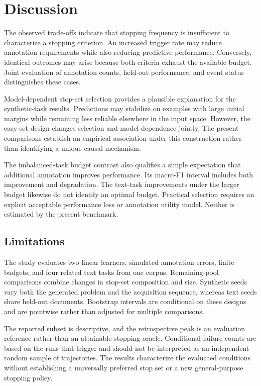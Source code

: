 \documentclass[10pt,twocolumn]{article}
\begin{document}
\section{Discussion}
The observed trade-offs indicate that stopping frequency is insufficient to characterize a stopping criterion. An increased trigger rate may reduce annotation requirements while also reducing predictive performance. Conversely, identical outcomes may arise because both criteria exhaust the available budget. Joint evaluation of annotation counts, held-out performance, and event status distinguishes these cases.

Model-dependent stop-set selection provides a plausible explanation for the synthetic-task results. Predictions may stabilize on examples with large initial margins while remaining less reliable elsewhere in the input space. However, the easy-set design changes selection and model dependence jointly. The present comparisons establish an empirical association under this construction rather than identifying a unique causal mechanism.

The imbalanced-task budget contrast also qualifies a simple expectation that additional annotation improves performance. Its macro-F1 interval includes both improvement and degradation. The text-task improvements under the larger budget likewise do not identify an optimal budget. Practical selection requires an explicit acceptable performance loss or annotation utility model. Neither is estimated by the present benchmark.

\subsection{Limitations}
The study evaluates two linear learners, simulated annotation errors, finite budgets, and four related text tasks from one corpus. Remaining-pool comparisons combine changes in stop-set composition and size. Synthetic seeds vary both the generated problem and the acquisition sequence, whereas text seeds share held-out documents. Bootstrap intervals are conditional on these designs and are pointwise rather than adjusted for multiple comparisons.

The reported subset is descriptive, and the retrospective peak is an evaluation reference rather than an attainable stopping oracle. Conditional failure counts are based on the runs that trigger and should not be interpreted as an independent random sample of trajectories. The results characterize the evaluated conditions without establishing a universally preferred stop set or a new general-purpose stopping policy.
\end{document}
